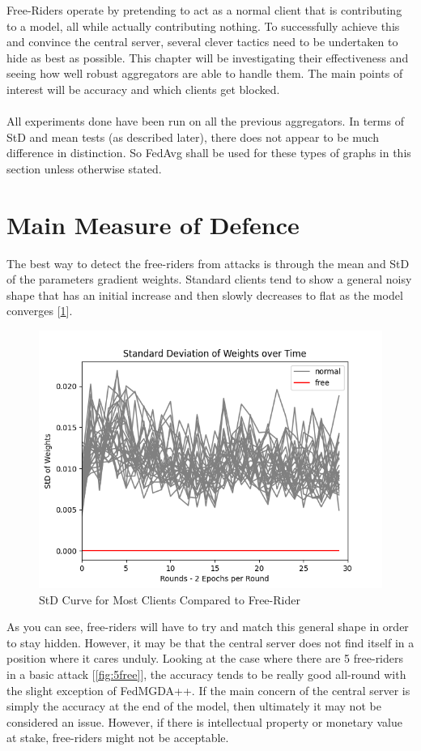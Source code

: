 Free-Riders operate by pretending to act as a normal client that is contributing to a model, all while actually contributing nothing.
To successfully achieve this and convince the central server, several clever tactics need to be undertaken to hide as best as possible.
This chapter will be investigating their effectiveness and seeing how well robust aggregators are able to handle them.
The main points of interest will be accuracy and which clients get blocked.
\\ \\
All experiments done have been run on all the previous aggregators. 
In terms of StD and mean tests (as described later), there does not appear to be much difference in distinction.
So FedAvg shall be used for these types of graphs in this section unless otherwise stated.

\section{Main Measure of Defence}
The best way to detect the free-riders from attacks is through the mean and StD of the parameters gradient weights.
Standard clients tend to show a general noisy shape that has an initial increase and then slowly decreases to flat as the model converges [\ref{fig:std_basic}].
\begin{figure}[htbp]
	\centering
    \includegraphics[scale=0.5]{free_riders/graphs/1_free.png}
	\caption{StD Curve for Most Clients Compared to Free-Rider}
	\label{fig:std_basic}
\end{figure}

As you can see, free-riders will have to try and match this general shape in order to stay hidden. 
However, it may be that the central server does not find itself in a position where it cares unduly.
Looking at the case where there are 5 free-riders in a basic attack [\ref{fig:5free}], the accuracy tends to be really good all-round with the slight exception of FedMGDA++.
If the main concern of the central server is simply the accuracy at the end of the model, then ultimately it may not be considered an issue.
However, if there is intellectual property or monetary value at stake, free-riders might not be acceptable.


